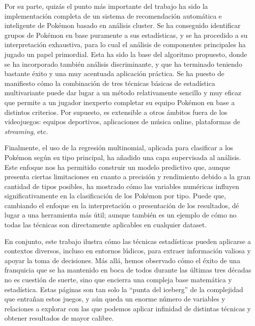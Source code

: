 \documentclass[
  12pt,
]{extreport}
\begin{document}
Por su parte, quizás el punto más importante del trabajo ha sido la
implementación completa de un sistema de recomendación automática e
inteligente de Pokémon basado en análisis cluster. Se ha conseguido
identificar grupos de Pokémon en base puramente a sus estadísticas, y se
ha procedido a su interpretación exhaustiva, para lo cual el análisis de
componentes principales ha jugado un papel primordial. Esta ha sido la
base del algoritmo propuesto, donde se ha incorporado también análisis
discriminante, y que ha terminado teniendo bastante éxito y una muy
acentuada aplicación práctica. Se ha puesto de manifiesto cómo la
combinación de tres técnicas básicas de estadística multivariante puede
dar lugar a un método relativamente sencillo y muy eficaz que permite a
un jugador inexperto completar su equipo Pokémon en base a distintos
criterios. Por supuesto, es extensible a otros ámbitos fuera de los
videojuegos: equipos deportivos, aplicaciones de música online,
plataformas de \emph{streaming}, etc.

Finalmente, el uso de la regresión multinomial, aplicada para clasificar
a los Pokémon según su tipo principal, ha añadido una capa supervisada
al análisis. Este enfoque nos ha permitido construir un modelo
predictivo que, aunque presenta ciertas limitaciones en cuanto a
precisión y rendimiento debido a la gran cantidad de tipos posibles, ha
mostrado cómo las variables numéricas influyen significativamente en la
clasificación de los Pokémon por tipo. Puede que, cambiando el enfoque
en la interpretación o presentación de los resultados, dé lugar a una
herramienta más útil; aunque también es un ejemplo de cómo no todas las
técnicas son directamente aplicables en cualquier dataset.

En conjunto, este trabajo ilustra cómo las técnicas estadísticas pueden
aplicarse a contextos diversos, incluso en entornos lúdicos, para
extraer información valiosa y apoyar la toma de decisiones. Más allá,
hemos observado cómo el éxito de una franquicia que se ha mantenido en
boca de todos durante las últimas tres décadas no es cuestión de suerte,
sino que encierra una compleja base matemática y estadística. Estas
páginas son tan solo la ``punta del iceberg'' de la complejidad que
entrañan estos juegos, y aún queda un enorme número de variables y
relaciones a explorar con las que podemos aplicar infinidad de distintas
técnicas y obtener resultados de mayor calibre.
\end{document}
